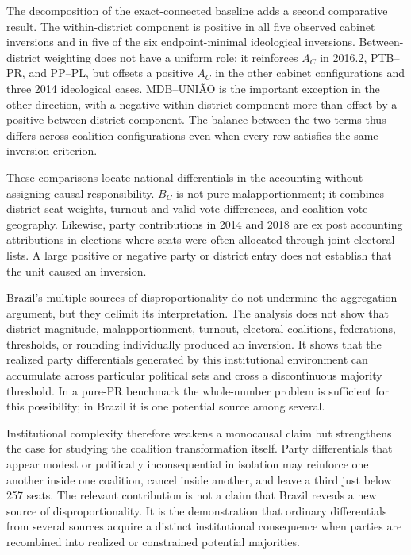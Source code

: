 \documentclass[11pt]{article}
\begin{document}
The decomposition of the exact-connected baseline adds a second comparative
result. The within-district component is positive in all five observed cabinet
inversions and in five of the six endpoint-minimal ideological inversions.
Between-district weighting does
not have a uniform role: it reinforces \(A_C\) in 2016.2, PTB--PR, and PP--PL,
but offsets a positive \(A_C\) in the other cabinet configurations and three
2014 ideological cases. MDB--UNIÃO is the important exception in the other
direction, with a negative within-district component more than offset by a
positive between-district component. The balance between the two terms thus
differs across coalition configurations even when every row satisfies the same
inversion criterion.

These comparisons locate national differentials in the accounting without
assigning causal responsibility. \(B_C\) is not pure malapportionment; it
combines district seat weights, turnout and valid-vote differences, and
coalition vote geography. Likewise, party contributions in 2014 and 2018 are ex
post accounting attributions in elections where seats were often allocated
through joint electoral lists. A large positive or negative party or district
entry does not establish that the unit caused an inversion.

Brazil's multiple sources of disproportionality do not undermine the
aggregation argument, but they delimit its interpretation. The analysis does
not show that district magnitude, malapportionment, turnout, electoral
coalitions, federations, thresholds, or rounding individually produced an
inversion. It shows that the realized party differentials generated by this
institutional environment can accumulate across particular political sets and
cross a discontinuous majority threshold. In a pure-PR benchmark the
whole-number problem is sufficient for this possibility; in Brazil it is one
potential source among several.

Institutional complexity therefore weakens a monocausal claim but strengthens
the case for studying the coalition transformation itself. Party differentials
that appear modest or politically inconsequential in isolation may reinforce
one another inside one coalition, cancel inside another, and leave a third just
below 257 seats. The relevant contribution is not a claim that Brazil reveals
a new source of disproportionality. It is the demonstration that ordinary
differentials from several sources acquire a distinct institutional consequence
when parties are recombined into realized or constrained potential majorities.
\end{document}
